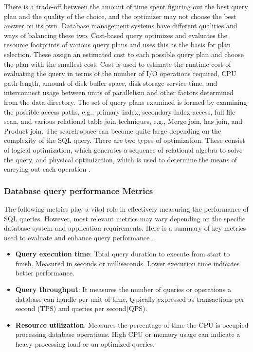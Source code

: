 There is a trade-off between the amount of time spent figuring out the best query plan and the quality of the choice, and the optimizer may not choose the best answer on its own. Database management systems have different qualities and ways of balancing these two. Cost-based query optimizes and evaluates the resource footprints of various query plans and uses this as the basis for plan selection. These assign an estimated cost to each possible query plan and choose the plan with the smallest cost. Cost is used to estimate the runtime cost of evaluating the query in terms of the number of I/O operations required, CPU path length, amount of disk buffer space, disk storage service time, and interconnect usage between units of parallelism and other factors determined from the data directory. The set of query plans examined is formed by examining the possible access paths, e.g., primary index, secondary index access, full file scan, and various relational table join techniques, e.g., Merge join, has join, and Product join. The search space can become quite large depending on the complexity of the SQL query. There are two types of optimization. These consist of logical optimization, which generates a sequence of relational algebra to solve the query, and physical optimization, which is used to determine the means of carrying out each operation \cite{dremio-2024}.


\subsubsection{Database query performance Metrics}
The following metrics play a vital role in effectively measuring the performance of SQL queries. However, most relevant metrics may vary depending on the specific database system and application requirements.
Here is a summary of key metrics used to evaluate and enhance query performance \cite{chwesewicz-2024}.
\begin{itemize}
    \item\textbf{Query execution time}: Total query duration to execute from start to finish. Measured in seconds or milliseconds. Lower execution time indicates better performance.
    \item\textbf{Query throughput}: It measures the number of queries or operations a database can handle per unit of time, typically expressed as transactions per second (TPS) and queries per second(QPS).
    \item\textbf{Resource utilization}: Measures the percentage of time the CPU is occupied processing database operations. High CPU or memory usage can indicate a heavy processing load or un-optimized queries.
\end{itemize}
